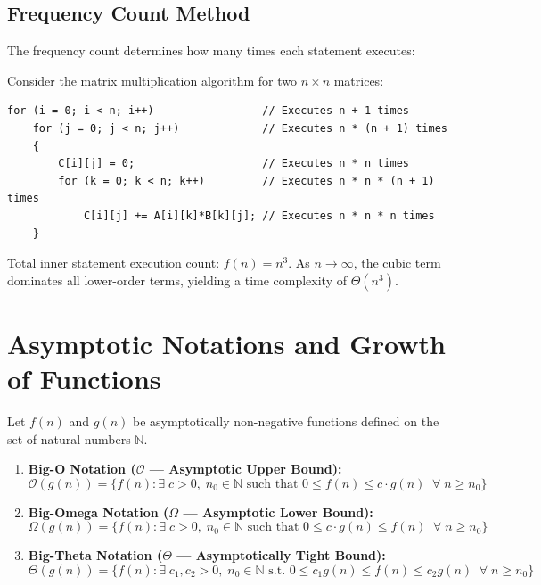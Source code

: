 \documentclass[12pt,a4paper]{article}
\begin{document}
\subsection{Frequency Count Method}
The frequency count determines how many times each statement executes:
\begin{tcolorbox}[examplebox, title={\textbf{Step-Count Analysis of Nested Loops}}]
Consider the matrix multiplication algorithm for two $n \times n$ matrices:
\begin{verbatim}
for (i = 0; i < n; i++)                 // Executes n + 1 times
    for (j = 0; j < n; j++)             // Executes n * (n + 1) times
    {
        C[i][j] = 0;                    // Executes n * n times
        for (k = 0; k < n; k++)         // Executes n * n * (n + 1) times
            C[i][j] += A[i][k]*B[k][j]; // Executes n * n * n times
    }
\end{verbatim}
Total inner statement execution count: $f(n) = n^3$. As $n \to \infty$, the cubic term dominates all lower-order terms, yielding a time complexity of $\Theta(n^3)$.
\end{tcolorbox}

\section{Asymptotic Notations and Growth of Functions}

\begin{tcolorbox}[defbox, title={\textbf{Formal Definitions of Asymptotic Bounds}}]
Let $f(n)$ and $g(n)$ be asymptotically non-negative functions defined on the set of natural numbers $\mathbb{N}$.
\par\vspace{4pt}
\begin{enumerate}[leftmargin=*, itemsep=4pt]
  \item \textbf{Big-O Notation ($\mathcal{O}$ --- Asymptotic Upper Bound):}
  \begin{equation}
    \mathcal{O}(g(n)) = \big\{ f(n) : \exists\; c > 0, \; n_0 \in \mathbb{N} \text{ such that } 0 \le f(n) \le c \cdot g(n) \;\; \forall\; n \ge n_0 \big\}
  \end{equation}
  \item \textbf{Big-Omega Notation ($\Omega$ --- Asymptotic Lower Bound):}
  \begin{equation}
    \Omega(g(n)) = \big\{ f(n) : \exists\; c > 0, \; n_0 \in \mathbb{N} \text{ such that } 0 \le c \cdot g(n) \le f(n) \;\; \forall\; n \ge n_0 \big\}
  \end{equation}
  \item \textbf{Big-Theta Notation ($\Theta$ --- Asymptotically Tight Bound):}
  \begin{equation}
    \Theta(g(n)) = \big\{ f(n) : \exists\; c_1, c_2 > 0, \; n_0 \in \mathbb{N} \text{ s.t. } 0 \le c_1 g(n) \le f(n) \le c_2 g(n) \;\; \forall\; n \ge n_0 \big\}
  \end{equation}
\end{enumerate}
\end{tcolorbox}
\end{document}
